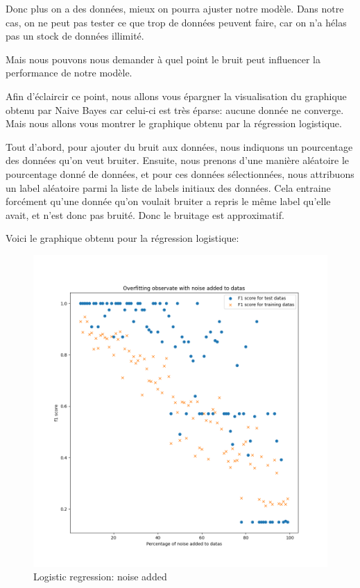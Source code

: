 \documentclass[
]{article}
\begin{document}
Donc plus on a des données, mieux on pourra ajuster notre modèle. Dans
notre cas, on ne peut pas tester ce que trop de données peuvent faire,
car on n'a hélas pas un stock de données illimité.

Mais nous pouvons nous demander à quel point le bruit peut influencer la
performance de notre modèle.

Afin d'éclaircir ce point, nous allons vous épargner la visualisation du
graphique obtenu par Naive Bayes car celui-ci est très éparse: aucune
donnée ne converge. Mais nous allons vous montrer le graphique obtenu
par la régression logistique.

Tout d'abord, pour ajouter du bruit aux données, nous indiquons un
pourcentage des données qu'on veut bruiter. Ensuite, nous prenons d'une
manière aléatoire le pourcentage donné de données, et pour ces données
sélectionnées, nous attribuons un label aléatoire parmi la liste de
labels initiaux des données. Cela entraine forcément qu'une donnée qu'on
voulait bruiter a repris le même label qu'elle avait, et n'est donc pas
bruité. Donc le bruitage est approximatif.

Voici le graphique obtenu pour la régression logistique:

\begin{figure}
\centering
\includegraphics{../res/overfitting_reg_2.png}
\caption{Logistic regression: noise added}
\end{figure}
\end{document}
